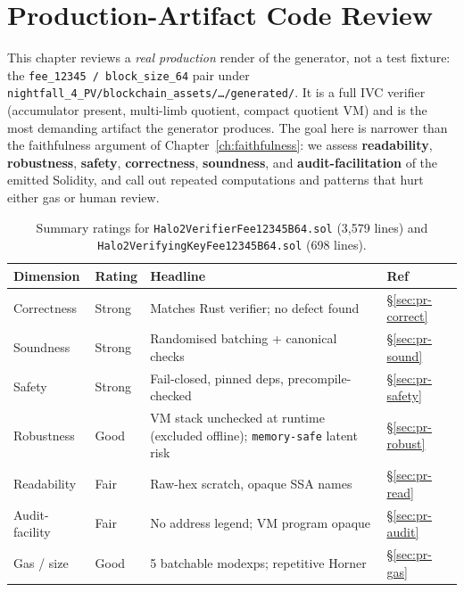 \chapter{Production-Artifact Code Review}
\label{ch:prod-review}

This chapter reviews a \emph{real production} render of the generator,
not a test fixture: the \texttt{fee\_\allowbreak{}12345 /\allowbreak{} block\_\allowbreak{}size\_\allowbreak{}64} pair under
\texttt{nightfall\_\allowbreak{}4\_\allowbreak{}PV/\allowbreak{}blockchain\_\allowbreak{}assets/\allowbreak{}\ldots/\allowbreak{}generated/\allowbreak{}}. It is a
full IVC verifier (accumulator present, multi-limb quotient, compact
quotient VM) and is the most demanding artifact the generator produces.
The goal here is narrower than the faithfulness argument of
Chapter~\ref{ch:faithfulness}: we assess \textbf{readability},
\textbf{robustness}, \textbf{safety}, \textbf{correctness},
\textbf{soundness}, and \textbf{audit-facilitation} of the emitted
Solidity, and call out repeated computations and patterns that hurt
either gas or human review.

\begin{table}[h]
\centering\small
\begin{tabular}{@{}llp{8.2em}l@{}}
\toprule
\textbf{Dimension} & \textbf{Rating} & \textbf{Headline} & \textbf{Ref} \\
\midrule
Correctness   & \textcolor{tracegreen}{Strong}   & Matches Rust verifier; no defect found & \S\ref{sec:pr-correct} \\
Soundness     & \textcolor{tracegreen}{Strong}   & Randomised batching + canonical checks & \S\ref{sec:pr-sound} \\
Safety        & \textcolor{tracegreen}{Strong}   & Fail-closed, pinned deps, precompile-checked & \S\ref{sec:pr-safety} \\
Robustness    & \textcolor{mathpurple}{Good}    & VM stack unchecked at runtime (excluded offline); \texttt{memory-safe} latent risk & \S\ref{sec:pr-robust} \\
Readability   & \textcolor{codegenblue}{Fair}   & Raw-hex scratch, opaque SSA names & \S\ref{sec:pr-read} \\
Audit-facility& \textcolor{codegenblue}{Fair}   & No address legend; VM program opaque & \S\ref{sec:pr-audit} \\
Gas / size    & \textcolor{mathpurple}{Good}    & 5 batchable modexps; repetitive Horner & \S\ref{sec:pr-gas} \\
\bottomrule
\end{tabular}
\caption{Summary ratings for \texttt{Halo2VerifierFee12345B64.sol}
(3{,}579 lines) and \texttt{Halo2VerifyingKeyFee12345B64.sol} (698 lines).}
\end{table}

